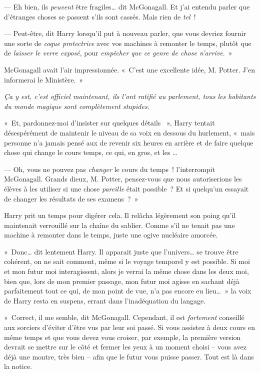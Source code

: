 --- Eh bien, ils \emph{peuvent} être fragiles… dit McGonagall.
Et j'ai entendu parler que d'étranges choses se passent s'ils sont cassés.
Mais rien de \emph{tel}~!

--- Peut-être, dit Harry lorsqu'il put à nouveau parler, que vous devriez fournir une sorte de \emph{coque protectrice} avec vos machines à remonter le temps, plutôt que de \emph{laisser le verre exposé}, pour \emph{empêcher que ce genre de chose n'arrive}.~»

McGonagall avait l'air impressionnée.
«~C'est une excellente idée, M. Potter.
J'en informerai le Ministère.~»

\emph{Ça y est, c'est officiel maintenant, ils l'ont ratifié au parlement, tous les habitants du monde magique sont complètement stupides.}

«~Et, pardonnez-moi d'insister sur quelques détails ~», Harry tentait désespérément de maintenir le niveau de sa voix en dessous du hurlement, «~mais personne n'a jamais pensé aux  de revenir six heures en arrière et de faire quelque chose qui change le cours temps, ce qui, en gros,  et les …

--- Oh, vous ne pouvez pas \emph{changer} le cours du temps~! l'interrompit McGonagall.
Grands dieux, M. Potter, pensez-vous que nous autoriserions les élèves à les utiliser si une chose \emph{pareille} était possible~?
Et si quelqu'un essayait de changer les résultats de ses examens~?~»

Harry prit un temps pour digérer cela.
Il relâcha légèrement son poing qu'il maintenait verrouillé sur la chaîne du sablier.
Comme s'il ne tenait pas une machine à remonter dans le temps, juste une ogive nucléaire amorcée.

«~Donc… dit lentement Harry.
Il apparait juste que l'univers… se trouve être cohérent, on ne sait comment, même si le voyage temporel y est possible.
Si moi et mon futur moi interagissent, alors je verrai la même chose dans les deux moi, bien que, lors de mon premier passage, mon futur moi agisse en sachant déjà parfaitement tout ce qui, de mon point de vue, n'a pas encore eu lieu…~» la voix de Harry resta en suspens, errant dans l'inadéquation du langage.

«~Correct, il me semble, dit McGonagall.
Cependant, il est \emph{fortement} conseillé aux sorciers d'éviter d'être vus par leur soi passé.
Si vous assistez à deux cours en même temps et que vous devez vous croiser, par exemple, la première version devrait se mettre sur le côté et fermer les yeux à un moment choisi -- vous avez déjà une montre, très bien -- afin que le futur vous puisse passer.
Tout est là dans la notice.


